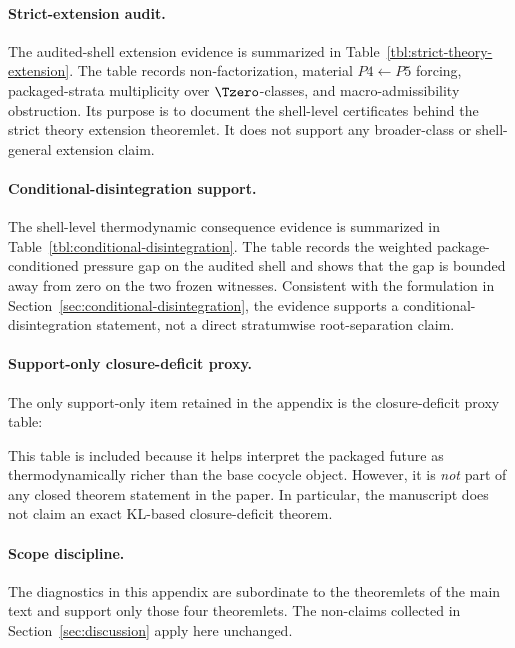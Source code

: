 \paragraph{Strict-extension audit.}
The audited-shell extension evidence is summarized in Table~\ref{tbl:strict-theory-extension}. The table records non-factorization, material \(P4\leftarrow P5\) forcing, packaged-strata multiplicity over \(\Tzero\)-classes, and macro-admissibility obstruction. Its purpose is to document the shell-level certificates behind the strict theory extension theoremlet. It does not support any broader-class or shell-general extension claim.

\paragraph{Conditional-disintegration support.}
The shell-level thermodynamic consequence evidence is summarized in Table~\ref{tbl:conditional-disintegration}. The table records the weighted package-conditioned pressure gap on the audited shell and shows that the gap is bounded away from zero on the two frozen witnesses. Consistent with the formulation in Section~\ref{sec:conditional-disintegration}, the evidence supports a conditional-disintegration statement, not a direct stratumwise root-separation claim.

\paragraph{Support-only closure-deficit proxy.}
The only support-only item retained in the appendix is the closure-deficit proxy table:

This table is included because it helps interpret the packaged future as thermodynamically richer than the base cocycle object. However, it is \emph{not} part of any closed theorem statement in the paper. In particular, the manuscript does not claim an exact KL-based closure-deficit theorem.

\paragraph{Scope discipline.}
The diagnostics in this appendix are subordinate to the theoremlets of the main text and support only those four theoremlets. The non-claims collected in Section~\ref{sec:discussion} apply here unchanged.
